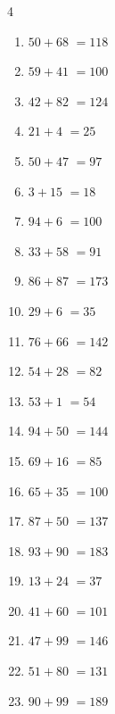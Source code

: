 \begin{multicols}{4}
\begin{enumerate}
  \item $50+68$
        $=118$

  \item $59+41$
        $=100$

  \item $42+82$
        $=124$

  \item $21+4$
        $=25$

  \item $50+47$
        $=97$

  \item $3+15$
        $=18$

  \item $94+6$
        $=100$

  \item $33+58$
        $=91$

  \item $86+87$
        $=173$

  \item $29+6$
        $=35$

  \item $76+66$
        $=142$

  \item $54+28$
        $=82$

  \item $53+1$
        $=54$

\columnbreak %

  \item $94+50$
        $=144$

  \item $69+16$
        $=85$

  \item $65+35$
        $=100$

  \item $87+50$
        $=137$

  \item $93+90$
        $=183$

  \item $13+24$
        $=37$

  \item $41+60$
        $=101$

  \item $47+99$
        $=146$

  \item $51+80$
        $=131$

  \item $90+99$
        $=189$


\end{enumerate}
\end{multicols}
